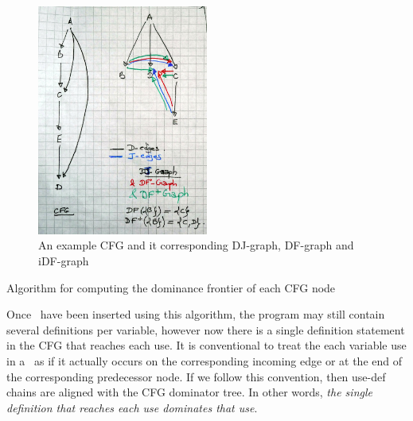 \begin{figure}
\includegraphics[width=0.5\textwidth]{iDF.jpeg}
\caption{\label{fig:classical_construction_algorithm:iDF}An example CFG and it corresponding DJ-graph, DF-graph and iDF-graph}
\end{figure}

\begin{algorithm}
\caption{\label{alg:classical_construction:df}Algorithm for computing the dominance frontier of each CFG node}
\end{algorithm}



Once \phifuns\ have been inserted using this algorithm, the program may
still contain several definitions per variable, however now there is a
single definition statement 
in the CFG that reaches each use. 
It is conventional to treat the each variable use in a \phifun\
as if it actually occurs on the corresponding incoming edge or at the end of the
corresponding predecessor node.
If we follow this convention,  
then use-def chains are aligned with the CFG dominator tree.
In other words,
\emph{the single definition that reaches each use dominates that use}.

